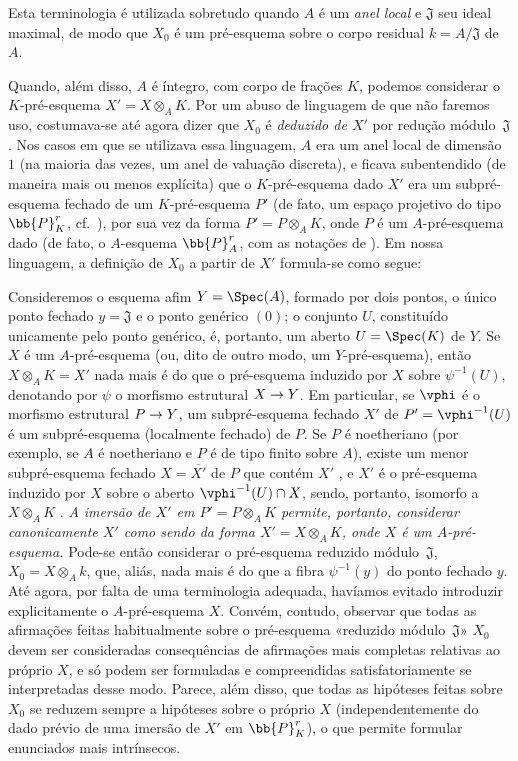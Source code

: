 \documentclass[oneside]{amsart}
\makeatletter
\newcommand{\ega@arrow}[2]{\mathchoice{#1}{#2}{#2}{#2}}
\renewcommand{\to}{\ega@arrow{\longrightarrow}{\rightarrow}}
\newcommand{\oldpage}[2][]{{\marginnote{\normalfont\textbf{#1}~|~#2}}\ignorespaces}
\let\EGAOriginalLabel\label
\renewcommand{\label}[1]{\phantomsection\EGAOriginalLabel{#1}}
\makeatother
\begin{document}
\begin{env}[3.7.2]
\label{I.3.7.2}
Esta terminologia é utilizada sobretudo quando $A$ é um \emph{anel local} e $\mathfrak{J}$ seu ideal maximal, de modo que $X_0$ é um pré-esquema sobre o corpo residual $k=A/\mathfrak{J}$ de $A$.

Quando, além disso, $A$ é íntegro, com corpo de frações $K$, podemos considerar o $K$-pré-esquema $X'=X\otimes_A K$.
Por um abuso de linguagem de que não faremos uso, costumava-se até agora dizer que $X_0$ é \emph{deduzido de $X'$} por redução módulo~$\mathfrak{J}$.
Nos casos em que se utilizava essa linguagem, $A$ era um anel local de dimensão~$1$ (na maioria das vezes, um anel de valuação discreta), e ficava subentendido (de maneira mais ou menos explícita) que o $K$-pré-esquema dado $X'$ era um subpré-esquema fechado de um $K$-pré-esquema $P'$ (de fato, um espaço projetivo do tipo $\bb{P}_K^r$, cf.~), por sua vez da forma $P'=P\otimes_A K$, onde $P$ é um $A$-pré-esquema dado (de fato, o $A$-esquema $\bb{P}_A^r$, com as notações de ).
Em nossa linguagem, a definição de $X_0$ a partir de $X'$ formula-se como segue:

Consideremos o esquema afim $Y=\Spec(A)$, formado por dois pontos, o único ponto fechado
\oldpage[I]{119}
$y=\mathfrak{J}$ e o ponto genérico $(0)$; o conjunto $U$, constituído unicamente pelo ponto genérico, é, portanto, um aberto $U=\Spec(K)$ de $Y$.
Se $X$ é um $A$-pré-esquema (ou, dito de outro modo, um $Y$-pré-esquema), então $X\otimes_A K=X'$ nada mais é do que o pré-esquema induzido por $X$ sobre $\psi^{-1}(U)$, denotando por $\psi$ o morfismo estrutural $X\to Y$.
Em particular, se $\vphi$ é o morfismo estrutural $P\to Y$, um subpré-esquema fechado $X'$ de $P'=\vphi^{-1}(U)$ é um subpré-esquema (localmente fechado) de $P$.
Se $P$ é noetheriano (por exemplo, se $A$ é noetheriano e $P$ é de tipo finito sobre $A$), existe um menor subpré-esquema fechado $X=\overline{X'}$ de $P$ que contém $X'$ , e $X'$ é o pré-esquema induzido por $X$ sobre o aberto $\vphi^{-1}(U)\cap X$, sendo, portanto, isomorfo a $X\otimes_A K$ .
\emph{A imersão de $X'$ em $P'=P\otimes_A K$ permite, portanto, considerar canonicamente $X'$ como sendo da forma $X'=X\otimes_A K$, onde $X$ é um $A$-pré-esquema.}
Pode-se então considerar o pré-esquema reduzido módulo~$\mathfrak{J}$, $X_0=X\otimes_A k$, que, aliás, nada mais é do que a fibra $\psi^{-1}(y)$ do ponto fechado $y$.
Até agora, por falta de uma terminologia adequada, havíamos evitado introduzir explicitamente o $A$-pré-esquema $X$.
Convém, contudo, observar que todas as afirmações feitas habitualmente sobre o pré-esquema «reduzido módulo~$\mathfrak{J}$» $X_0$ devem ser consideradas consequências de afirmações mais completas relativas ao próprio $X$, e só podem ser formuladas e compreendidas satisfatoriamente se interpretadas desse modo.
Parece, além disso, que todas as hipóteses feitas sobre $X_0$ se reduzem sempre a hipóteses sobre o próprio $X$ (independentemente do dado prévio de uma imersão de $X'$ em $\bb{P}_K^r$), o que permite formular enunciados mais intrínsecos.
\end{env}
\end{document}
